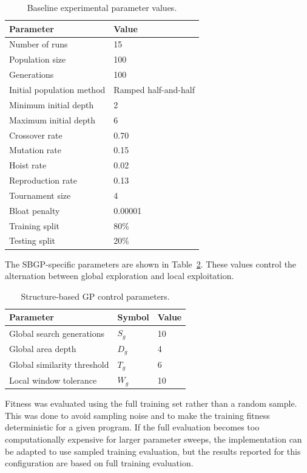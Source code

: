 \documentclass{article}
\begin{document}
\begin{table}[h]
\centering
\begin{tabular}{|l|l|}
\hline
\textbf{Parameter} & \textbf{Value} \\
\hline
Number of runs & 15 \\
Population size & 100 \\
Generations & 100 \\
Initial population method & Ramped half-and-half \\
Minimum initial depth & 2 \\
Maximum initial depth & 6 \\
Crossover rate & 0.70 \\
Mutation rate & 0.15 \\
Hoist rate & 0.02 \\
Reproduction rate & 0.13 \\
Tournament size & 4 \\
Bloat penalty & 0.00001 \\
Training split & 80\% \\
Testing split & 20\% \\
\hline
\end{tabular}
\caption{Baseline experimental parameter values.}
\label{tab:parameters}
\end{table}

The SBGP-specific parameters are shown in Table~\ref{tab:sbgp-parameters}. These values control the alternation between global exploration and local exploitation.

\begin{table}[h]
\centering
\begin{tabular}{|l|l|l|}
\hline
\textbf{Parameter} & \textbf{Symbol} & \textbf{Value} \\
\hline
Global search generations & $S_g$ & 10 \\
Global area depth & $D_g$ & 4 \\
Global similarity threshold & $T_g$ & 6 \\
Local window tolerance & $W_g$ & 10 \\
\hline
\end{tabular}
\caption{Structure-based GP control parameters.}
\label{tab:sbgp-parameters}
\end{table}

Fitness was evaluated using the full training set rather than a random sample. This was done to avoid sampling noise and to make the training fitness deterministic for a given program. If the full evaluation becomes too computationally expensive for larger parameter sweeps, the implementation can be adapted to use sampled training evaluation, but the results reported for this configuration are based on full training evaluation.
\end{document}
